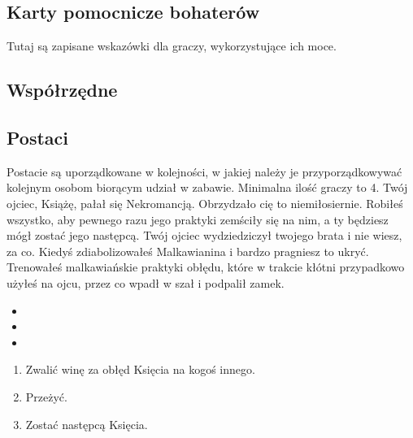 	\subsection{Karty pomocnicze bohaterów}
		Tutaj są zapisane wskazówki dla graczy, wykorzystujące ich moce.

	\subsection{Współrzędne}
	\label{sec:wspolrzedne}
		\begin{multicols}{3}
		\end{multicols}

	\subsection{Postaci}
	\label{sec:characters}
		Postacie są uporządkowane w kolejności, w jakiej należy je przyporządkowywać kolejnym osobom biorącym udział w zabawie.
		Minimalna ilość graczy to 4.
		\thispagestyle{empty}
			{}{
			Twój ojciec, Książę, pałał się Nekromancją.
			Obrzydzało cię to niemiłosiernie.
			Robiłeś wszystko, aby pewnego razu jego praktyki zemściły się na nim, a ty będziesz mógł zostać jego następcą.
			Twój ojciec wydziedziczył twojego brata i nie wiesz, za co.
			Kiedyś zdiabolizowałeś Malkawianina i bardzo pragniesz to ukryć.
			Trenowałeś malkawiańskie praktyki obłędu, które w trakcie kłótni przypadkowo użyłeś na ojcu, przez co wpadł w szał i podpalił zamek.}
			{
				\begin{itemize}[noitemsep]
					\item {}
					\item {}
					\item {}
				\end{itemize}

			}{
				\begin{enumerate}[noitemsep]
					\item Zwalić winę za obłęd Księcia na kogoś innego.
					\item Przeżyć.
					\item Zostać następcą Księcia.
				\end{enumerate}
			}
			{}
			{}
			
